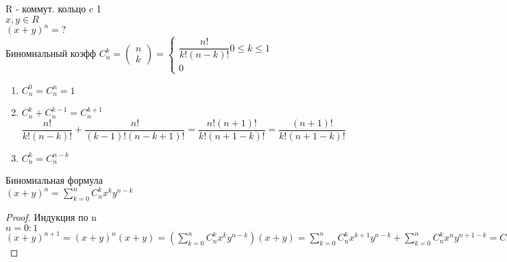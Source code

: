 \begin{definition}
	R - коммут. кольцо c 1\\
	$ x, y \in R $\\
	$ (x+y)^n = ? $  \\
	Биномиальный коэфф $ C^k_n = \begin{pmatrix}
	n \\
	k
	\end{pmatrix}
	= \left\{ \begin{matrix} \dfrac{n!}{k! (n-k) !} 0 \leq k \leq 1  \\
	0	\end{matrix}  \right. $
	\begin{properties}
		 \begin{enumerate}
		 	\item $ C^0_n = C^n_n = 1 $
		 	\item $ C^k_n + C^{k-1}_n = C^{k+1}_n$ \\
		 	$\dfrac{n!}{k!(n-k)!} + \dfrac{n!}{(k-1)!(n-k+1)!} = \dfrac{n!(n+1)!}{k!(n+1-k)!} = \dfrac{(n+1)!}{k!(n+1-k)!} $
		 	\item $ C^k_n = C^{n-k}_n $
		 \end{enumerate}
	\end{properties}
\end{definition}
\begin{theorem} Биномиальная формула \\
	$ (x+ y)^n = \sum_{k=0}^{n} C_n^k x^k y^{n-k} $ \\
	\begin{proof}
		Индукция по n \\
		$ n = 0 : 1 $ \\
		$ (x+y)^{n+1} = (x+y)^n(x+y) =  ( \sum_{k=0}^{n} C_n^k x^k y^{n-k} )(x+y) = \sum_{k={0}}^{n} C_n^k x^{k+1} y^{n-k} + \sum_{k=0}^{n} C_n^k x^ny^{n+1-k} = C^n_n x^{n+1} + \sum_{k=0}^{n-1} C_n^k x^{k+1} y^{n-k} + \sum_{k=1}^{n} C_n^k x^k y^{m+1-k} +C_n^0 y^{n+1} = C^n_n + \sum_{k'=1}^{n} C_n^{k'-1} \cdot x^{k'}y^{n+1-k'} + 
			\sum_{k=1}^n C_n^k x^ky^{n+1-k}+C_n^0y^{n+1} =  $
	\end{proof}
\end{theorem}





